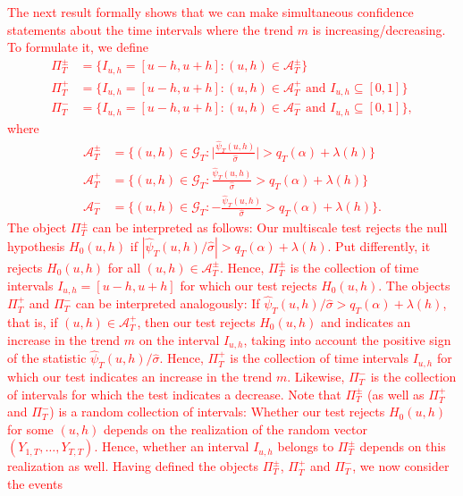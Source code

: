 \textcolor{red}{
The next result formally shows that we can make simultaneous confidence statements about the time intervals where the trend $m$ is increasing/decreasing. To formulate it, we define 
\begin{align*}
\Pi_T^\pm  & = \big\{ I_{u,h} = [u-h,u+h]: (u,h) \in \mathcal{A}_T^\pm \big\} \\
\Pi_T^+ & = \big\{ I_{u,h} = [u-h,u+h]: (u,h) \in \mathcal{A}_T^+ \text{ and } I_{u,h} \subseteq [0,1] \big\} \\
\Pi_T^- & = \big\{ I_{u,h} = [u-h,u+h]: (u,h) \in \mathcal{A}_T^- \text{ and } I_{u,h} \subseteq [0,1] \big\}, 
\end{align*}
where 
\begin{align*}
\mathcal{A}_T^\pm & = \Big\{ (u,h) \in \mathcal{G}_T: \Big|\frac{\widehat{\psi}_T(u,h)}{\widehat{\sigma}}\Big| > q_T(\alpha) + \lambda(h) \Big\} \\ 
\mathcal{A}_T^+  & = \Big\{ (u,h) \in \mathcal{G}_T: \frac{\widehat{\psi}_T(u,h)}{\widehat{\sigma}} > q_T(\alpha) + \lambda(h) \Big\} \\ 
\mathcal{A}_T^-  & = \Big\{ (u,h) \in \mathcal{G}_T: -\frac{\widehat{\psi}_T(u,h)}{\widehat{\sigma}} > q_T(\alpha) + \lambda(h) \Big\}. 
\end{align*}
The object $\Pi_T^\pm$ can be interpreted as follows: Our multiscale test rejects the null hypo\-thesis $H_0(u,h)$ if $|\widehat{\psi}_T(u,h)/\widehat{\sigma}| > q_T(\alpha) + \lambda(h)$. Put differently, it rejects $H_0(u,h)$ for all $(u,h) \in \mathcal{A}_T^\pm$. Hence, $\Pi_T^\pm$ is the collection of time intervals $I_{u,h} = [u-h,u+h]$ for which our test rejects $H_0(u,h)$. The objects $\Pi_T^+$ and $\Pi_T^-$ can be interpreted analogously: If $\widehat{\psi}_T(u,h)/\widehat{\sigma} > q_T(\alpha) + \lambda(h)$, that is, if $(u,h) \in \mathcal{A}_T^+$, then our test rejects $H_0(u,h)$ and indicates an increase in the trend $m$ on the interval $I_{u,h}$, taking into account the positive sign of the statistic $\widehat{\psi}_T(u,h)/\widehat{\sigma}$. Hence, $\Pi_T^+$ is the collection of time intervals $I_{u,h}$ for which our test indicates an increase in the trend $m$. Likewise, $\Pi_T^-$ is the collection of intervals for which the test indicates a decrease. Note that $\Pi_T^{\pm}$ (as well as $\Pi_T^+$ and $\Pi_T^-$) is a random collection of intervals: Whether our test rejects $H_0(u,h)$ for some $(u,h)$ depends on the realization of the random vector $(Y_{1,T},\ldots,Y_{T,T})$. Hence, whether an interval $I_{u,h}$ belongs to $\Pi_T^{\pm}$ depends on this realization as well. Having defined the objects $\Pi_T^\pm$, $\Pi_T^+$ and $\Pi_T^-$, we now consider the events}
